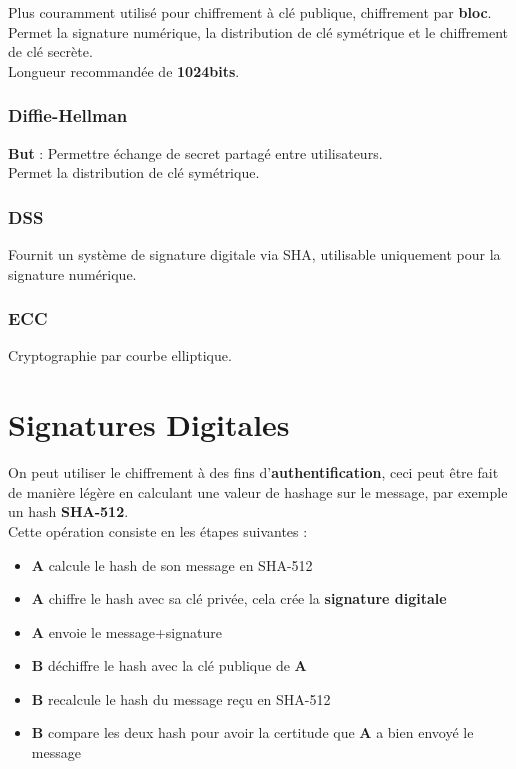 \documentclass{report}
\begin{document}
		 		Plus couramment utilisé pour chiffrement à clé publique, chiffrement par \textbf{bloc}.\\
		 		Permet la signature numérique, la distribution de clé symétrique et le chiffrement de clé secrète.\\
		 		Longueur recommandée de \textbf{1024bits}.\\

		 	\subsubsection{Diffie-Hellman}

		 		\textbf{But} : Permettre échange de secret partagé entre utilisateurs.\\
		 		Permet la distribution de clé symétrique.\\

		 	\subsubsection{DSS}

		 		Fournit un système de signature digitale via SHA, utilisable uniquement pour la signature numérique.\\

		 	\subsubsection{ECC}

		 		Cryptographie par courbe elliptique.\\
		 	
	\section{Signatures Digitales}

		On peut utiliser le chiffrement à des fins d'\textbf{authentification}, ceci peut être fait de manière légère en calculant une valeur de hashage sur le message, par exemple un hash \textbf{SHA-512}.\\

		Cette opération consiste en les étapes suivantes : \\

		\begin{itemize}
			\item \textbf{A} calcule le hash de son message en SHA-512
			\item \textbf{A} chiffre le hash avec sa clé privée, cela crée la \textbf{signature digitale}
			\item \textbf{A} envoie le message+signature
			\item \textbf{B} déchiffre le hash avec la clé publique de \textbf{A}
			\item \textbf{B} recalcule le hash du message reçu en SHA-512
			\item \textbf{B} compare les deux hash pour avoir la certitude que \textbf{A} a bien envoyé le message \\
		\end{itemize}
\end{document}
